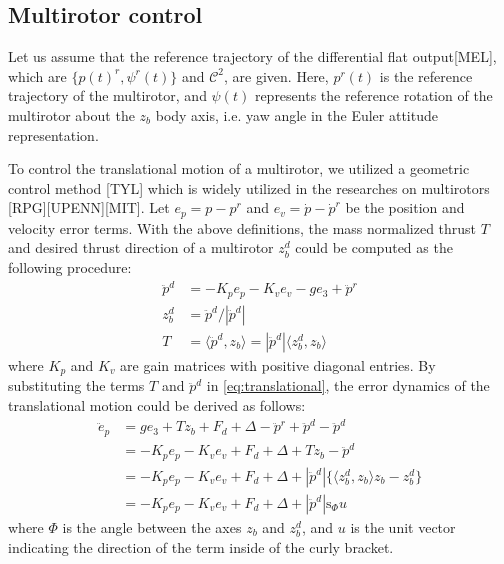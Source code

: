 \documentclass[letterpaper, 10 pt, conference]{ieeeconf}  %
\begin{document}
\subsection{Multirotor control} \label{sec:controller}
Let us assume that the reference trajectory of the differential flat output[MEL], which are $\{p(t)^r,\psi^r(t)\}$ and $\mathcal{C}^2$, are given.
Here, $p^r(t)$ is the reference trajectory of the multirotor, and $\psi(t)$ represents the reference rotation of the multirotor about the $z_b$ body axis, i.e. yaw angle in the Euler attitude representation.

To control the translational motion of a multirotor, we utilized a geometric control method [TYL] which is widely utilized in the researches on multirotors [RPG][UPENN][MIT].
Let $e_p = p - p^r$ and $e_v = \dot{p} - \dot{p}^r$ be the position and velocity error terms.
With the above definitions, the mass normalized thrust $T$ and desired thrust direction of a multirotor $z_b^d$ could be computed as the following procedure:
\begin{align}
\ddot{p}^{d} &= -K_p e_p - K_v e_v -ge_3 + \ddot{p}^r \label{eq:ddpd} \\
z_b^{d} &= \ddot{p}^{d}/|\ddot{p}^{d}| \nonumber \\
T &= \langle \ddot{p}^{d}, z_b \rangle = |\ddot{p}^{d}|\langle z_b^d, z_b \rangle \nonumber 
\end{align}
where $K_p$ and $K_v$ are gain matrices with positive diagonal entries.
By substituting the terms $T$ and $\ddot{p}^d$ in \eqref{eq:translational}, the error dynamics of the translational motion could be derived as follows:
\begin{align}
\ddot{e}_p &= ge_3 + Tz_b + F_d + \Delta - \ddot{p}^r + \ddot{p}^d - \ddot{p}^d \nonumber \\
&= -K_pe_p -K_ve_v + F_d + \Delta + Tz_b - \ddot{p}^d \nonumber \\
&= -K_pe_p -K_ve_v + F_d + \Delta + |\ddot{p}^d|\{\langle z_b^d, z_b \rangle z_b - z_b^d\} \nonumber \\
&= -K_pe_p -K_ve_v + F_d + \Delta +  |\ddot{p}^d|\text{s}_\Phi u \label{eq:translationalError1}
\end{align}
where $\Phi$ is the angle between the axes $z_b$ and $z_b^d$, and $u$ is the unit vector indicating the direction of the term inside of the curly bracket.
\end{document}
